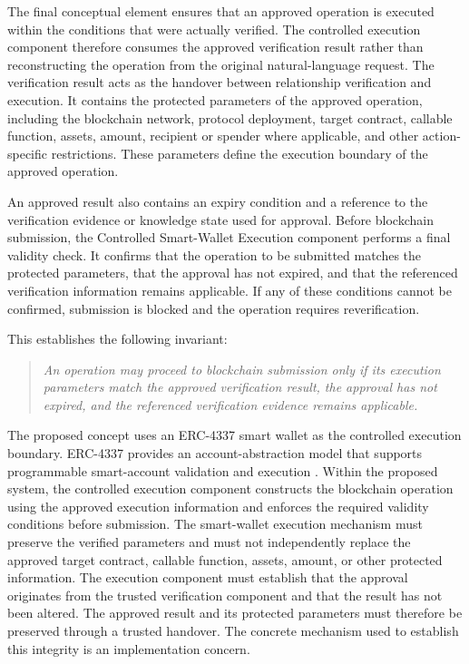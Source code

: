 The final conceptual element ensures that an approved operation is executed
within the conditions that were actually verified. The controlled execution
component therefore consumes the approved verification result rather than
reconstructing the operation from the original natural-language request. The verification result acts as the handover between relationship verification
and execution. It contains the protected parameters of the approved operation,
including the blockchain network, protocol deployment, target contract,
callable function, assets, amount, recipient or spender where applicable,
and other action-specific restrictions. These parameters define the
execution boundary of the approved operation.

An approved result also contains an expiry condition and a reference to the
verification evidence or knowledge state used for approval. Before blockchain
submission, the Controlled Smart-Wallet Execution component performs a final
validity check. It confirms that the operation to be submitted matches the
protected parameters, that the approval has not expired, and that the referenced
verification information remains applicable. If any of these conditions cannot
be confirmed, submission is blocked and the operation requires reverification.

This establishes the following invariant:

\begin{quote}
\textit{An operation may proceed to blockchain submission only if its
execution parameters match the approved verification result, the approval
has not expired, and the referenced verification evidence remains applicable.}
\end{quote}

The proposed concept uses an ERC-4337 smart wallet as the controlled execution
boundary. ERC-4337 provides an account-abstraction model that supports
programmable smart-account validation and execution \cite{erc4337}. Within
the proposed system, the controlled execution component constructs the
blockchain operation using the approved execution information and enforces
the required validity conditions before submission. The smart-wallet
execution mechanism must preserve the verified parameters and must not
independently replace the approved target contract, callable function,
assets, amount, or other protected information. The execution component must establish that the approval originates from
the trusted verification component and that the result has not been
altered. The approved result and its protected parameters must therefore
be preserved through a trusted handover. The concrete mechanism used
to establish this integrity is an implementation concern.


